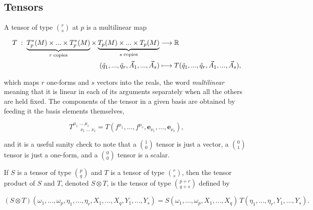     \subsection{Tensors}

        A tensor of type $\binom{r}{s}$ at $p$ is a multilinear map

        \begin{equation}
            \begin{split}
                T\;:\;\underbrace{T_p^*(M) \times ... \times T_p^*(M)}_{r\;\text{copies}}\times \underbrace{T_p(M) \times ... \times T_p(M)}_{s\;\text{copies}} &\longrightarrow \mathbb{R}\\
                (\Tilde{q}_1,...,\Tilde{q}_r,\Vec{A}_1,...,\Vec{A}_s) &\longmapsto T(\Tilde{q}_1,...,\Tilde{q}_r,\Vec{A}_1,...,\Vec{A}_s),
            \end{split}
        \end{equation}

        which maps $r$ one-forms and $s$ vectors into the reals, the word \textit{multilinear} meaning that it is linear in each of its arguments separately when all the others are held fixed. The components of the tensor in a given basis are obtained by feeding it the basis elements themselves,

        \begin{equation}
            T^{\mu_1\;...\;\mu_r}_{\quad\;\;\nu_1\;...\;\nu_s} = T(f^{\mu_1},...,f^{\mu_r},\mathbf{e}_{\nu_1},...,\mathbf{e}_{\nu_s}),
        \end{equation}

        and it is a useful sanity check to note that a $\binom{1}{0}$ tensor is just a vector, a $\binom{0}{1}$ tensor is just a one-form, and a $\binom{0}{0}$ tensor is a scalar.

        \begin{myDef}
            If $S$ is a tensor of type $\binom{p}{q}$ and $T$ is a tensor of type $\binom{r}{s}$, then the tensor product of $S$ and $T$, denoted $S \otimes T$, is the tensor of type $\binom{p + r }{q + s}$ defined by

            \begin{equation}
                \left(S \otimes T\right)(\omega_1,...,\omega_p,\eta_1,...,\eta_r,X_1,...,X_q,Y_1,...,Y_s) = S(\omega_1,...,\omega_p,X_1,...,X_q)\,T(\eta_1,...,\eta_r,Y_1,...,Y_s).
            \end{equation}
        \end{myDef}

